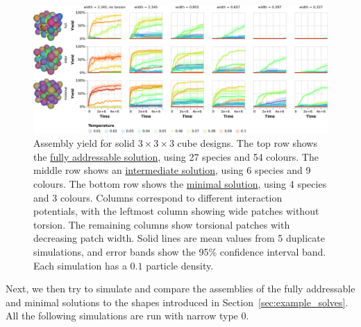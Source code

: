 \begin{figure}[ht]
    \centering
    \includegraphics[width=\linewidth]{figures/patchysim/solidCubePotentials.eps}
    \caption{Assembly yield for solid \(3 \times 3 \times 3\) cube designs. The top row shows the \href{https://akodiat.github.io/polycubes/?decRule=|1:0||2:1||3:0_-1:2|4:0||5:1||6:0_|7:0|-2:1|8:1||9:0_|10:0||11:1|-3:2|12:0_-4:2|||13:1||14:0_-7:2|15:0|-5:1|16:1||17:0_-10:2|18:0||19:1|-6:2|20:0_-15:2||-13:1|21:1||22:0_-18:2|||23:1|-14:2|24:0_|25:0|-11:1|26:1|-9:2|27:0_|28:0||29:1|-12:2|_-25:2|30:0|-19:1|31:1|-17:2|32:0_-28:2|33:0||34:1|-20:2|_-30:2||-23:1|35:1|-22:2|36:0_-33:2|||37:1|-24:2|_|38:0|-29:1|39:1|-27:2|_-38:2|40:0|-34:1|41:1|-32:2|_-40:2||-37:1|42:1|-36:2|_|43:0|-8:1|||44:0_-43:2|45:0|-16:1|||46:0_-45:2||-21:1|||47:0_|48:0|-26:1||-44:2|49:0_-48:2|50:0|-31:1||-46:2|51:0_-50:2||-35:1||-47:2|52:0_|53:0|-39:1||-49:2|_-53:2|54:0|-41:1||-51:2|_-54:2||-42:1||-52:2|}{fully addressable solution}, using 27 species and 54 colours. The middle row shows an \href{https://akodiat.github.io/polycubes/?assemblyMode=stochastic&rule=10101113232391001d1d8c2400a2949495970c00a5001b1a1700009d0a8598008a000400}{intermediate solution}, using 6 species and 9 colours. The bottom row shows the \href{https://akodiat.github.io/polycubes/?assemblyMode=stochastic&rule=0a0a0b0a0908878784868b00060000078e8f000c0c00000e}{minimal solution}, using 4 species and 3 colours. Columns correspond to different interaction potentials, with the leftmost column showing wide patches without torsion. The remaining columns show torsional patches with decreasing patch width. Solid lines are mean values from 5 duplicate simulations, and error bands show the 95\% confidence interval band. Each simulation has a \(0.1\) particle density.}
    \label{fig:solidCubePotentials}
\end{figure}


Next, we then try to simulate and compare the assemblies of the fully addressable and minimal solutions to the shapes introduced in Section~\ref{sec:example_solves}. All the following simulations are run with narrow type 0.

